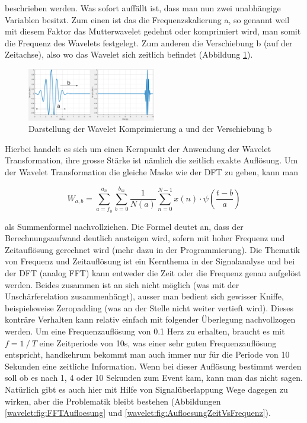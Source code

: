 beschrieben werden. Was sofort auffällt ist, dass man nun zwei unabhängige Variablen besitzt. Zum einen ist das die Frequenzskalierung a, so genannt weil mit diesem Faktor das Mutterwavelet gedehnt oder komprimiert wird, man somit die Frequenz des Wavelets festgelegt. Zum anderen die Verschiebung b (auf der Zeitachse), also wo das Wavelet sich zeitlich befindet (Abbildung \ref{wavelet:fig:5_WaveletKompUndShift}).

\begin{figure}
	\centering
	\includegraphics[width=0.5\textwidth]{papers/wavelets/images/5_WaveletKompUndShift.png}
	\caption{Darstellung der Wavelet Komprimierung a und der Verschiebung b}
	\label{wavelet:fig:5_WaveletKompUndShift}
\end{figure}

Hierbei handelt es sich um einen Kernpunkt der Anwendung der Wavelet Transformation, ihre grosse Stärke ist nämlich die zeitlich exakte Auflösung. Um der Wavelet Transformation die gleiche Maske wie der DFT zu geben, kann man

\begin{equation}
	W_{a,b}=\sum_{a=f_0}^{a_n}\sum_{b=0}^{b_m}\frac{1}{N(a)}\sum_{n=0}^{N-1} x(n)\cdot\psi\left(\frac{t-b}{a}\right)
	\label{wavelets:equation4}
\end{equation}

als Summenformel nachvollziehen. Die Formel deutet an, dass der Berechnungsaufwand deutlich ansteigen wird, sofern mit hoher Frequenz und Zeitauflösung gerechnet wird (mehr dazu in der Programmierung).
Die Thematik von Frequenz und Zeitauflösung ist ein Kernthema in der Signalanalyse und bei der DFT (analog FFT) kann entweder die Zeit oder die Frequenz genau aufgelöst werden. Beides zusammen ist an sich nicht möglich (was mit der Unschärferelation zusammenhängt), ausser man bedient sich gewisser Kniffe, beispielsweise Zeropadding (was an der Stelle nicht weiter vertieft wird). Dieses konträre Verhalten kann relativ einfach mit folgender Überlegung nachvollzogen werden.
Um eine Frequenzauflösung von 0.1 Herz zu erhalten, braucht es mit $f=1⁄T$ eine Zeitperiode von 10s, was einer sehr guten Frequenzauflösung entspricht, handkehrum bekommt man auch immer nur für die Periode von 10 Sekunden eine zeitliche Information. Wenn bei dieser Auflösung bestimmt werden soll ob es nach 1, 4 oder 10 Sekunden zum Event kam, kann man das nicht sagen. Natürlich gibt es auch hier mit Hilfe von Signalüberlappung Wege dagegen zu wirken, aber die Problematik bleibt bestehen (Abbildungen \ref{wavelet:fig:FFTAufloesung} und \ref{wavelet:fig:AufloesungZeitVsFrequenz}).

